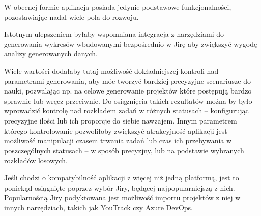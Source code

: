 W obecnej formie aplikacja posiada jedynie podstawowe funkcjonalności, pozostawiając nadal wiele pola do rozwoju.

Istotnym ulepszeniem byłaby wspomniana integracja z narzędziami do generowania wykresów wbudowanymi bezpośrednio w Jirę aby zwiększyć wygodę analizy generowanych danych.

Wiele wartości dodałaby tutaj możliwość dokładniejszej kontroli nad parametrami generowania, aby móc tworzyć bardziej precyzyjne scenariusze do nauki, pozwalając np. na celowe generowanie projektów
które postępują bardzo sprawnie lub wręcz przeciwnie. Do osiągnięcia takich rezultatów można by było wprowadzić kontrolę nad rozkładem zadań w różnych statusach -- konfigurując precyzyjne ilości lub
ich proporcje do siebie nawzajem. Innym parametrem którego kontrolowanie pozwoliłoby zwiększyć atrakcyjność aplikacji jest możliwość manipulacji czasem trwania zadań lub czas ich przebywania w 
poszczególnych statusach -- w sposób precyzjny, lub na podstawie wybranych rozkładów losowych.

Jeśli chodzi o kompatybilność aplikacji z więcej niż jedną platformą, jest to poniekąd osiągnięte poprzez wybór Jiry, będącej najpopularniejszą z nich.
Popularnością Jiry podyktowana jest możliwość importu projektów z niej w innych narzędziach, takich jak YouTrack czy Azure DevOps.